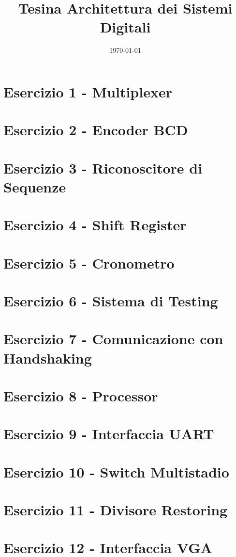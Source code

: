\documentclass[a4paper,14pt]{article}
\begin{document}
\title{Tesina Architettura dei Sistemi Digitali}
\date{\today}
\tableofcontents
\newpage
\section{Esercizio 1 - Multiplexer}
\newpage
\section{Esercizio 2 - Encoder BCD}
\newpage
\section{Esercizio 3 - Riconoscitore di Sequenze}
\newpage
\section{Esercizio 4 - Shift Register}
\newpage
\section{Esercizio 5 - Cronometro}
\newpage
\section{Esercizio 6 - Sistema di Testing}
\newpage
\section{Esercizio 7 - Comunicazione con Handshaking}
\newpage
\section{Esercizio 8 - Processor}
\newpage
\section{Esercizio 9 - Interfaccia UART}
\newpage
\section{Esercizio 10 - Switch Multistadio}
\newpage
\section{Esercizio 11 - Divisore Restoring}
\newpage
\section{Esercizio 12 - Interfaccia VGA}
\end{document}
